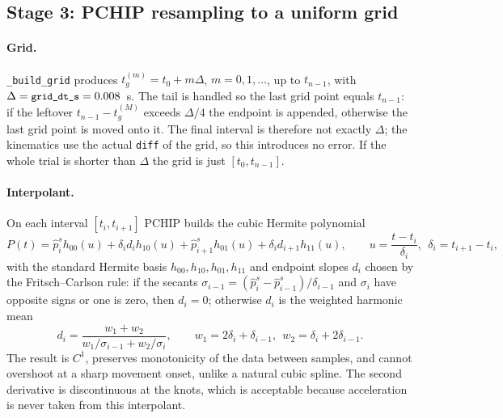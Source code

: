 \documentclass[11pt,a4paper]{article}
\newcommand{\code}[1]{\texttt{\small #1}}
\begin{document}
\subsection{Stage 3: PCHIP resampling to a uniform grid}

\paragraph{Grid.} \code{\_build\_grid} produces
$t_g^{(m)} = t_0 + m\Delta$, $m = 0, 1, \dots$, up to $t_{n-1}$, with
$\Delta = \code{grid\_dt\_s} = 0.008$~s. The tail is handled so the last grid
point equals $t_{n-1}$: if the leftover $t_{n-1} - t_g^{(M)}$ exceeds $\Delta/4$
the endpoint is appended, otherwise the last grid point is moved onto it. The
final interval is therefore not exactly $\Delta$; the kinematics use the actual
\code{diff} of the grid, so this introduces no error. If the whole trial is
shorter than $\Delta$ the grid is just $[t_0, t_{n-1}]$.

\paragraph{Interpolant.} On each interval $[t_i, t_{i+1}]$ PCHIP builds the
cubic Hermite polynomial
\begin{equation}
  P(t) = \hat p_i^{s} h_{00}(u) + \delta_i d_i h_{10}(u)
       + \hat p_{i+1}^{s} h_{01}(u) + \delta_i d_{i+1} h_{11}(u),
  \qquad u = \frac{t - t_i}{\delta_i},\ \ \delta_i = t_{i+1} - t_i,
  \label{eq:pchip}
\end{equation}
with the standard Hermite basis $h_{00}, h_{10}, h_{01}, h_{11}$ and endpoint
slopes $d_i$ chosen by the Fritsch--Carlson rule: if the secants
$\sigma_{i-1} = (\hat p_i^{s} - \hat p_{i-1}^{s})/\delta_{i-1}$ and $\sigma_i$
have opposite signs or one is zero, then $d_i = 0$; otherwise $d_i$ is the
weighted harmonic mean
\begin{equation}
  d_i = \frac{w_1 + w_2}{w_1/\sigma_{i-1} + w_2/\sigma_i},
  \qquad w_1 = 2\delta_i + \delta_{i-1},\ \ w_2 = \delta_i + 2\delta_{i-1}.
  \label{eq:fritsch}
\end{equation}
The result is $C^1$, preserves monotonicity of the data between samples, and
cannot overshoot at a sharp movement onset, unlike a natural cubic spline. The
second derivative is discontinuous at the knots, which is acceptable because
acceleration is never taken from this interpolant.
\end{document}
